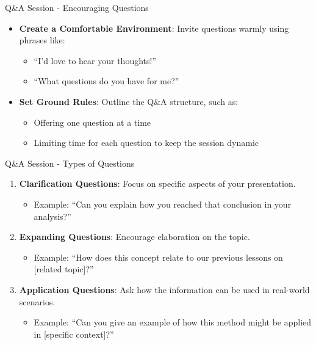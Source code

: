 \documentclass[aspectratio=169]{beamer}
\begin{document}
\begin{frame}[fragile]{Q\&A Session - Encouraging Questions}
    \begin{itemize}
        \item \textbf{Create a Comfortable Environment}: Invite questions warmly using phrases like:
            \begin{itemize}
                \item ``I’d love to hear your thoughts!''
                \item ``What questions do you have for me?''
            \end{itemize}
        \item \textbf{Set Ground Rules}: Outline the Q\&A structure, such as:
            \begin{itemize}
                \item Offering one question at a time
                \item Limiting time for each question to keep the session dynamic
            \end{itemize}
    \end{itemize}
\end{frame}

\begin{frame}[fragile]{Q\&A Session - Types of Questions}
    \begin{enumerate}
        \item \textbf{Clarification Questions}: Focus on specific aspects of your presentation.
            \begin{itemize}
                \item Example: ``Can you explain how you reached that conclusion in your analysis?''
            \end{itemize}
        \item \textbf{Expanding Questions}: Encourage elaboration on the topic.
            \begin{itemize}
                \item Example: ``How does this concept relate to our previous lessons on [related topic]?''
            \end{itemize}
        \item \textbf{Application Questions}: Ask how the information can be used in real-world scenarios.
            \begin{itemize}
                \item Example: ``Can you give an example of how this method might be applied in [specific context]?''
            \end{itemize}
    \end{enumerate}
\end{frame}
\end{document}
